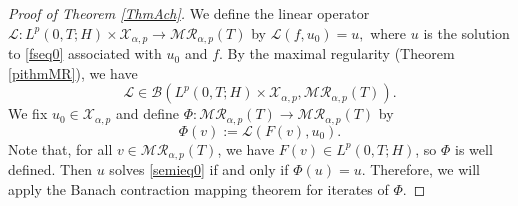 \documentclass[10pt,a4paper]{amsart}
\begin{document}
\begin{proof}[Proof of Theorem \ref{ThmAch}]
We define the linear operator $\mathcal{L}: L^p(0,T;H)\times\mathcal{X}_{\alpha,p}\to \mathcal{M}\mathcal{R}_{\alpha,p}(T)$ by  $\mathcal{L}(f,u_0)=u,$ where $u$ is the solution to \eqref{fseq0} associated with $u_0$ and $f$. By the maximal regularity (Theorem \ref{pithmMR}), we have $$\mathcal{L}\in \mathcal{B}\left(L^p(0,T;H)\times \mathcal{X}_{\alpha,p}, \mathcal{M}\mathcal{R}_{\alpha,p}(T)\right).$$ 
We fix $u_0\in \mathcal{X}_{\alpha,p}$ and define $\Phi:\mathcal{M}\mathcal{R}_{\alpha,p}(T)\to \mathcal{M}\mathcal{R}_{\alpha,p}(T)$ by
$$\Phi(v):=\mathcal{L}(F(v),u_0).$$
Note that, for all $v\in \mathcal{M}\mathcal{R}_{\alpha,p}(T)$, we have $F(v)\in L^p(0,T;H)$, so $\Phi$ is well defined. Then $u$ solves \eqref{semieq0} if and only if $\Phi(u)=u$. Therefore, we will apply the Banach contraction mapping theorem for iterates of $\Phi$.


\end{proof}
\end{document}
